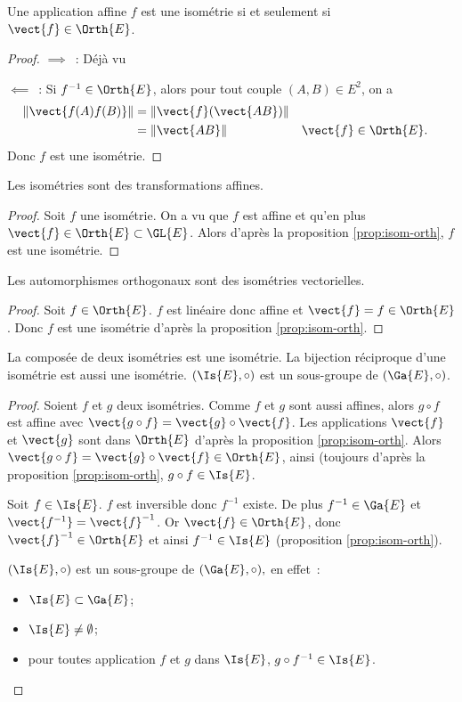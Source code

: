 \begin{prop}
  \label{prop:isom-orth}
  Une application affine $f$ est une isométrie si et seulement si $\vect{f} \in \Orth{E}$.
\end{prop}
\begin{proof}
  $\implies$~: Déjà vu

  $\impliedby$~: Si $f^{-1} \in \Orth{E}$, alors pour tout couple $(A,B) \in E^2$, on a
  \begin{align}
    \norme{\vect{f(A)f(B)}} &= \norme{\vect{f}(\vect{AB})} \\
    &=\norme{\vect{AB}} && \vect{f} \in \Orth{E}.
  \end{align}
  Donc $f$ est une isométrie.
\end{proof}

\begin{prop}
  Les isométries sont des transformations affines.
\end{prop}
\begin{proof}
  Soit $f$ une isométrie. On a vu que $f$ est affine et qu'en plus $\vect{f} \in \Orth{E} \subset \GL{E}$. Alors d'après la proposition \ref{prop:isom-orth}, $f$ est une isométrie.
\end{proof}

\begin{prop}
  Les automorphismes orthogonaux sont des isométries vectorielles.
\end{prop}
\begin{proof}
  Soit $f \in \Orth{E}$. $f$ est linéaire donc affine et $\vect{f}=f \in \Orth{E}$. Donc $f$ est une isométrie d'après la proposition \ref{prop:isom-orth}.
\end{proof}

\begin{prop}
  La composée de deux isométries est une isométrie. La bijection réciproque d'une isométrie est aussi une isométrie. $(\Is{E}, \circ)$ est un sous-groupe de $(\Ga{E}, \circ)$.
\end{prop}
\begin{proof}
  Soient $f$ et $g$ deux isométries. Comme $f$ et $g$ sont aussi affines, alors $g \circ f$ est affine avec $\vect{g \circ f}=\vect{g} \circ \vect{f}$. Les applications $\vect{f}$ et $\vect{g}$ sont dans $\Orth{E}$ d'après la proposition \ref{prop:isom-orth}. Alors $\vect{g \circ f}=\vect{g} \circ \vect{f} \in \Orth{E}$, ainsi (toujours d'après la proposition \ref{prop:isom-orth}, $g \circ f \in \Is{E}$.

  Soit $f \in \Is{E}$. $f$ est inversible donc $f^{-1}$ existe. De plus $f^{-1} \in \Ga{E}$ et $\vect{f^{-1}}=\vect{f}^{-1}$. Or $\vect{f} \in \Orth{E}$, donc $\vect{f}^{-1} \in \Orth{E}$ et ainsi $f^{-1} \in \Is{E}$ (proposition \ref{prop:isom-orth}).

  $(\Is{E}, \circ)$ est un sous-groupe de $(\Ga{E}, \circ),$ en effet~:
  \begin{itemize}
  \item $\Is{E} \subset \Ga{E}$;
  \item $\Is{E} \neq \emptyset$;
  \item pour toutes application $f$ et $g$ dans $\Is{E}$, $g \circ f^{-1} \in \Is{E}$.
  \end{itemize}
\end{proof}

